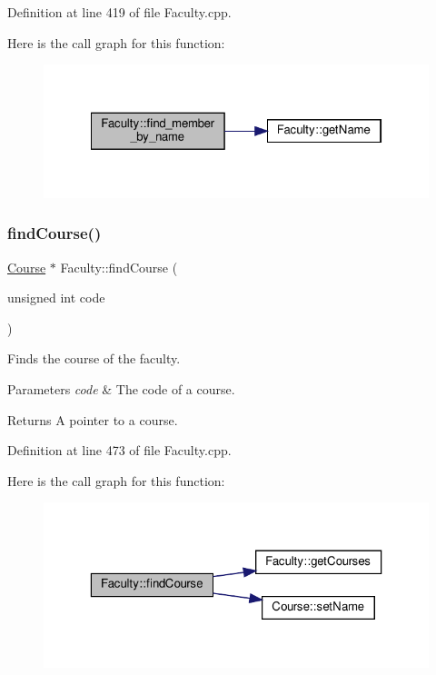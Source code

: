 Definition at line 419 of file Faculty.\+cpp.

Here is the call graph for this function\+:\nopagebreak
\begin{figure}[H]
\begin{center}
\leavevmode
\includegraphics[width=322pt]{classFaculty_ae5b2d7446d9a91bdc1599fee00ee4e6a_cgraph}
\end{center}
\end{figure}
\mbox{\label{classFaculty_a259de013771e90271b3a58d96a378e12}} 
\subsubsection{\texorpdfstring{find\+Course()}{findCourse()}}
{\footnotesize\ttfamily \hyperlink{classCourse}{Course} $\ast$ Faculty\+::find\+Course (\begin{DoxyParamCaption}\item[{unsigned int}]{code }\end{DoxyParamCaption})}

Finds the course of the faculty. 
\begin{DoxyParams}{Parameters}
{\em code} & The code of a course. \\
\hline
\end{DoxyParams}
\begin{DoxyReturn}{Returns}
A pointer to a course. 
\end{DoxyReturn}


Definition at line 473 of file Faculty.\+cpp.

Here is the call graph for this function\+:\nopagebreak
\begin{figure}[H]
\begin{center}
\leavevmode
\includegraphics[width=323pt]{classFaculty_a259de013771e90271b3a58d96a378e12_cgraph}
\end{center}
\end{figure}
\mbox{\label{classFaculty_a1c959f356e288ee08bb083e669c66742}} 
